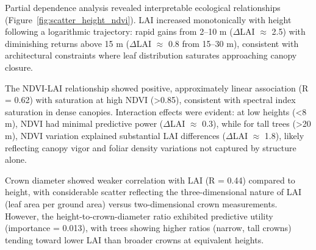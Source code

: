 Partial dependence analysis revealed interpretable ecological relationships (Figure~\ref{fig:scatter_height_ndvi}). LAI increased monotonically with height following a logarithmic trajectory: rapid gains from 2--10 m ($\Delta$LAI $\approx$ 2.5) with diminishing returns above 15 m ($\Delta$LAI $\approx$ 0.8 from 15--30 m), consistent with architectural constraints where leaf distribution saturates approaching canopy closure.

The NDVI-LAI relationship showed positive, approximately linear association (R = 0.62) with saturation at high NDVI (>0.85), consistent with spectral index saturation in dense canopies. Interaction effects were evident: at low heights (<8 m), NDVI had minimal predictive power ($\Delta$LAI $\approx$ 0.3), while for tall trees (>20 m), NDVI variation explained substantial LAI differences ($\Delta$LAI $\approx$ 1.8), likely reflecting canopy vigor and foliar density variations not captured by structure alone.

Crown diameter showed weaker correlation with LAI (R = 0.44) compared to height, with considerable scatter reflecting the three-dimensional nature of LAI (leaf area per ground area) versus two-dimensional crown measurements. However, the height-to-crown-diameter ratio exhibited predictive utility (importance = 0.013), with trees showing higher ratios (narrow, tall crowns) tending toward lower LAI than broader crowns at equivalent heights.
